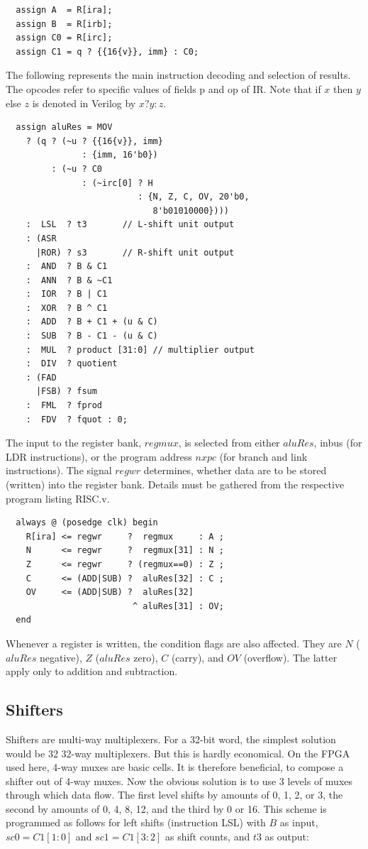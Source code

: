 \begin{verbatim}
  assign A  = R[ira];
  assign B  = R[irb];
  assign C0 = R[irc];
  assign C1 = q ? {{16{v}}, imm} : C0;
\end{verbatim}

The following represents the main instruction decoding and selection of results. The opcodes refer to
specific values of fields p and op of IR. Note that if $x$ then $y$ else $z$ is denoted in Verilog by $x ? y : z$.

\begin{verbatim}
  assign aluRes = MOV
    ? (q ? (~u ? {{16{v}}, imm}
               : {imm, 16'b0})
         : (~u ? C0
               : (~irc[0] ? H
                          : {N, Z, C, OV, 20'b0,
                             8'b01010000})))
    :  LSL  ? t3       // L-shift unit output
    : (ASR
      |ROR) ? s3       // R-shift unit output
    :  AND  ? B & C1
    :  ANN  ? B & ~C1
    :  IOR  ? B | C1
    :  XOR  ? B ^ C1
    :  ADD  ? B + C1 + (u & C)
    :  SUB  ? B - C1 - (u & C)
    :  MUL  ? product [31:0] // multiplier output
    :  DIV  ? quotient
    : (FAD
      |FSB) ? fsum
    :  FML  ? fprod
    :  FDV  ? fquot : 0;
\end{verbatim}

The input to the register bank, $regmux$, is selected from either $aluRes$, inbus (for LDR instructions),
or the program address $nxpc$ (for branch and link instructions). The signal $regwr$ determines,
whether data are to be stored (written) into the register bank. Details must be gathered from the
respective program listing RISC.v.

\begin{verbatim}
  always @ (posedge clk) begin
    R[ira] <= regwr     ?  regmux     : A ;
    N      <= regwr     ?  regmux[31] : N ;
    Z      <= regwr     ? (regmux==0) : Z ;
    C      <= (ADD|SUB) ?  aluRes[32] : C ;
    OV     <= (ADD|SUB) ?  aluRes[32]
                         ^ aluRes[31] : OV;
  end
\end{verbatim}

Whenever a register is written, the condition flags are also affected. They are $N$ ($aluRes$ negative),
$Z$ ($aluRes$ zero), $C$ (carry), and $OV$ (overflow). The latter apply only to addition and subtraction.

\subsection{Shifters}
Shifters are multi-way multiplexers. For a 32-bit word, the simplest solution would be 32 32-way
multiplexers. But this is hardly economical. On the FPGA used here, 4-way muxes are basic cells.
It is therefore beneficial, to compose a shifter out of 4-way muxes. Now the obvious solution is to
use 3 levels of muxes through which data flow. The first level shifts by amounts of 0, 1, 2, or 3, the
second by amounts of 0, 4, 8, 12, and the third by 0 or 16. This scheme is programmed as follows
for left shifts (instruction LSL) with $B$ as input, $sc0 = C1[1:0]$ and $sc1 = C1[3:2]$ as shift counts, and
$t3$ as output:

